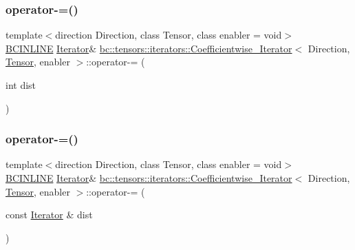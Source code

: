 \subsubsection{\texorpdfstring{operator-\/=()}{operator-=()}\hspace{0.1cm}{\footnotesize\ttfamily [1/2]}}
{\footnotesize\ttfamily template$<$direction Direction, class Tensor, class enabler = void$>$ \\
\hyperlink{common_8h_a6699e8b0449da5c0fafb878e59c1d4b1}{B\+C\+I\+N\+L\+I\+NE} \hyperlink{structbc_1_1tensors_1_1iterators_1_1Coefficientwise__Iterator_a313f76f47e60a806035279a36a84f835}{Iterator}\& \hyperlink{structbc_1_1tensors_1_1iterators_1_1Coefficientwise__Iterator}{bc\+::tensors\+::iterators\+::\+Coefficientwise\+\_\+\+Iterator}$<$ Direction, \hyperlink{namespacebc_a659391e47ab612be3ba6c18cf9c89159}{Tensor}, enabler $>$\+::operator-\/= (\begin{DoxyParamCaption}\item[{int}]{dist }\end{DoxyParamCaption})\hspace{0.3cm}{\ttfamily [inline]}}

\mbox{\label{structbc_1_1tensors_1_1iterators_1_1Coefficientwise__Iterator_a7e2d3b20e178c55d9de5806fe8b4bbc7}} 
\subsubsection{\texorpdfstring{operator-\/=()}{operator-=()}\hspace{0.1cm}{\footnotesize\ttfamily [2/2]}}
{\footnotesize\ttfamily template$<$direction Direction, class Tensor, class enabler = void$>$ \\
\hyperlink{common_8h_a6699e8b0449da5c0fafb878e59c1d4b1}{B\+C\+I\+N\+L\+I\+NE} \hyperlink{structbc_1_1tensors_1_1iterators_1_1Coefficientwise__Iterator_a313f76f47e60a806035279a36a84f835}{Iterator}\& \hyperlink{structbc_1_1tensors_1_1iterators_1_1Coefficientwise__Iterator}{bc\+::tensors\+::iterators\+::\+Coefficientwise\+\_\+\+Iterator}$<$ Direction, \hyperlink{namespacebc_a659391e47ab612be3ba6c18cf9c89159}{Tensor}, enabler $>$\+::operator-\/= (\begin{DoxyParamCaption}\item[{const \hyperlink{structbc_1_1tensors_1_1iterators_1_1Coefficientwise__Iterator_a313f76f47e60a806035279a36a84f835}{Iterator} \&}]{dist }\end{DoxyParamCaption})\hspace{0.3cm}{\ttfamily [inline]}}

